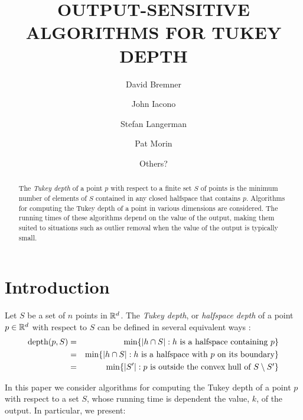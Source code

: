 \documentclass[charterfonts,lotsofwhite]{patmorin}
\title{\MakeUppercase{Output-Sensitive Algorithms for Tukey Depth}}
\author{David Bremner \and
	John Iacono \and
	Stefan Langerman \and
	Pat Morin \and
	Others?}
\date{}
\newcommand{\td}{\mathrm{depth}}
\begin{document}
\maketitle

\begin{abstract}
The \emph{Tukey depth} of a point $p$ with respect to a finite set $S$ of
points is the minimum number of elements of $S$ contained in any
closed halfspace that contains $p$.  Algorithms for computing the
Tukey depth of a point in various dimensions are considered.  The
running times of these algorithms depend on the value of the output,
making them suited to situations such as outlier removal when the
value of the output is typically small.
\end{abstract}

\section{Introduction}

Let $S$ be a set of $n$ points in $\mathbb{R}^d$.
The \emph{Tukey depth}, or \emph{halfspace depth} of a point $p\in\mathbb{R}^d$ with
respect to $S$ can be defined in several equivalent ways \cite{t73}:
\begin{eqnarray}
\td(p,S) & = & \min\{ |h\cap S| :
	             \mbox{$h$ is a halfspace containing $p$} \} \\ 
                     \eqlabel{tuk-orig}
            & = & \min\{ |h\cap S| :
                      \mbox{$h$ is a halfspace with $p$ on its boundary} \} \\ 
                       \eqlabel{tuk-boundary}
            & = & \min\{ |S'| :
                      \mbox{$p$ is outside the convex hull of 
                           $S\setminus S'$} \}
                      \eqlabel{tuk-hull}
\end{eqnarray}

In this paper we consider algorithms for computing the Tukey depth of
a point $p$ with respect to a set $S$, whose running time is dependent
the value, $k$, of the output. In particular, we present:
\end{document}
